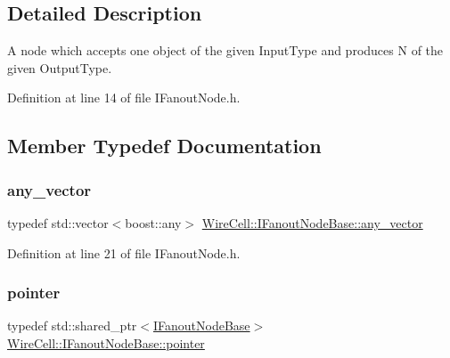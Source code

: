 \subsection{Detailed Description}
A node which accepts one object of the given Input\+Type and produces N of the given Output\+Type. 

Definition at line 14 of file I\+Fanout\+Node.\+h.



\subsection{Member Typedef Documentation}
\mbox{\label{class_wire_cell_1_1_i_fanout_node_base_a855b32ed7f2d37d84aaf21e94edeacc4}} 
\subsubsection{\texorpdfstring{any\+\_\+vector}{any\_vector}}
{\footnotesize\ttfamily typedef std\+::vector$<$boost\+::any$>$ \hyperlink{class_wire_cell_1_1_i_fanout_node_base_a855b32ed7f2d37d84aaf21e94edeacc4}{Wire\+Cell\+::\+I\+Fanout\+Node\+Base\+::any\+\_\+vector}}



Definition at line 21 of file I\+Fanout\+Node.\+h.

\mbox{\label{class_wire_cell_1_1_i_fanout_node_base_a0c125eb41bc2290d1ffd5d93ea0185ac}} 
\subsubsection{\texorpdfstring{pointer}{pointer}}
{\footnotesize\ttfamily typedef std\+::shared\+\_\+ptr$<$\hyperlink{class_wire_cell_1_1_i_fanout_node_base}{I\+Fanout\+Node\+Base}$>$ \hyperlink{class_wire_cell_1_1_i_fanout_node_base_a0c125eb41bc2290d1ffd5d93ea0185ac}{Wire\+Cell\+::\+I\+Fanout\+Node\+Base\+::pointer}}



